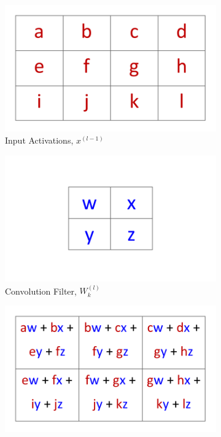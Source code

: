 \documentclass[12pt,letterpaper]{article}
\begin{document}
\begin{figure}[H]
\begin{center}
	\begin{subfigure}{0.45\textwidth}
	\includegraphics[scale=0.6]{../figures/2DConvExample(a)}
	\caption{Input Activations, $x^{(l-1)}$}
	\end{subfigure}	
	\begin{subfigure}{0.45\textwidth}
	\includegraphics[scale=0.6]{../figures/2DConvExample(b)}
	\caption{Convolution Filter, $W^{(l)}_k$}
	\end{subfigure}	
	\begin{subfigure}{0.9\textwidth}
	\centering
	\includegraphics[scale=0.6]{../figures/2DConvExample(c)}

\end{subfigure}
\end{center}
\end{figure}
\end{document}
